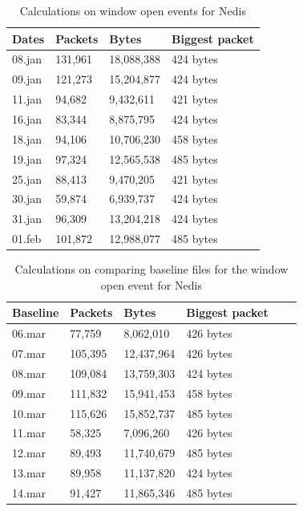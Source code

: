 \begin{table}[H]
\centering
    \caption{Calculations on window open events for Nedis}
\label{tab:NedisWindowCalculations}
    \begin{tabular}{|l|l|l|l|}
        \hline
        \textbf{Dates} & \textbf{Packets} & \textbf{Bytes} & \textbf{Biggest packet} \\ \hline
        08.jan          & 131,961          & 18,088,388     & 424 bytes               \\ \hline
        09.jan          & 121,273          & 15,204,877     & 424 bytes               \\ \hline
        11.jan          & 94,682           & 9,432,611      & 421 bytes               \\ \hline
        16.jan          & 83,344           & 8,875,795      & 424 bytes               \\ \hline
        18.jan          & 94,106           & 10,706,230     & 458 bytes               \\ \hline
        19.jan          & 97,324           & 12,565,538     & 485 bytes               \\ \hline
        25.jan          & 88,413           & 9,470,205      & 421 bytes               \\ \hline
        30.jan          & 59,874           & 6,939,737      & 424 bytes               \\ \hline
        31.jan          & 96,309           & 13,204,218     & 424 bytes               \\ \hline
        01.feb          & 101,872          & 12,988,077     & 485 bytes               \\ \hline
    \end{tabular}
\end{table}

\begin{table}[H]
    \centering
    \caption{Calculations on comparing baseline files for the window open event for Nedis}
    \begin{tabular}{|l|l|l|l|l|l|}
    \hline
        \textbf{Baseline} & \textbf{Packets} & \textbf{Bytes} & \textbf{Biggest packet} \\ \hline
        06.mar & 77,759  & 8,062,010  & 426 bytes \\ \hline
        07.mar & 105,395 & 12,437,964 & 426 bytes \\ \hline
        08.mar & 109,084 & 13,759,303 & 424 bytes \\ \hline
        09.mar & 111,832 & 15,941,453 & 458 bytes \\ \hline
        10.mar & 115,626 & 15,852,737 & 485 bytes \\ \hline
        11.mar & 58,325  & 7,096,260  & 426 bytes \\ \hline
        12.mar & 89,493  & 11,740,679 & 485 bytes \\ \hline
        13.mar & 89,958  & 11,137,820 & 424 bytes \\ \hline
        14.mar & 91,427  & 11,865,346 & 485 bytes \\ \hline
    \end{tabular}
    \label{tab:NedisBaselineWindowCalculations}
\end{table}

